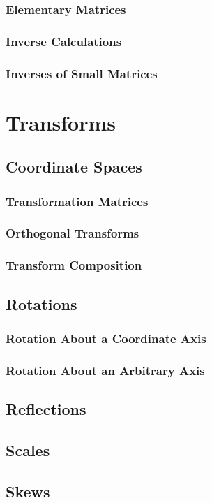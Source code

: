 \documentclass[a4paper,10pt]{article}
\begin{document}
\subsubsection{Elementary Matrices}
\subsubsection{Inverse Calculations}
\subsubsection{Inverses of Small Matrices}
\section{Transforms}
\subsection{Coordinate Spaces}
\subsubsection{Transformation Matrices}
\subsubsection{Orthogonal Transforms}
\subsubsection{Transform Composition}
\subsection{Rotations}
\subsubsection{Rotation About a Coordinate Axis}
\subsubsection{Rotation About an Arbitrary Axis}
\subsection{Reflections}
\subsection{Scales}
\subsection{Skews}
\end{document}
